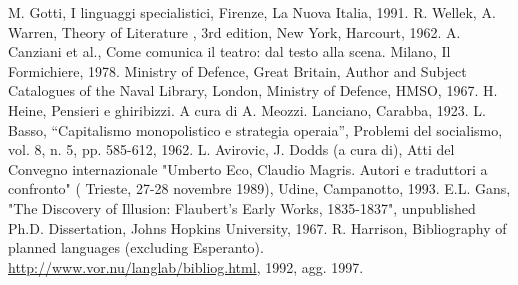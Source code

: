\documentclass[a4paper,12pt]{report}
\begin{document}
%
%
\begin{thebibliography}{00}
%
M. Gotti, I linguaggi specialistici, Firenze, La Nuova Italia, 1991.
%
R. Wellek, A. Warren, Theory of Literature , 3rd edition, New York, Harcourt, 1962.
%
A. Canziani et al., Come comunica il teatro: dal testo alla scena. Milano, Il Formichiere, 1978.
%
Ministry of Defence, Great Britain, Author and Subject Catalogues of the Naval Library, London, Ministry of Defence, HMSO, 1967.
%
H. Heine, Pensieri e ghiribizzi. A cura di A. Meozzi. Lanciano, Carabba, 1923.
%
L. Basso, ``Capitalismo monopolistico e strategia operaia'', Problemi del socialismo, vol. 8, n. 5, pp. 585-612, 1962.
%
L. Avirovic, J. Dodds (a cura di), Atti del Convegno internazionale "Umberto Eco, Claudio Magris. Autori e traduttori a confronto" ( Trieste, 27-28 novembre 1989), Udine, Campanotto, 1993.
%
E.L. Gans, "The Discovery of Illusion: Flaubert's Early Works, 1835-1837", unpublished Ph.D. Dissertation, Johns Hopkins University, 1967.
%
R. Harrison, Bibliography of planned languages (excluding Esperanto).  \url{http://www.vor.nu/langlab/bibliog.html}, 1992, agg. 1997.
%
\end{thebibliography}
% 
\end{document}
